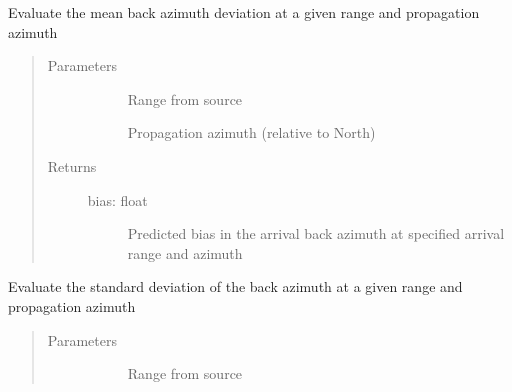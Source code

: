 \documentclass[letterpaper,10pt,english]{sphinxmanual}
\begin{document}
\begin{fulllineitems}
\begin{fulllineitems}
\label{\detokenize{stochprop.propagation:stochprop.propagation.PathGeometryModel.eval_az_dev_mn}}
Evaluate the mean back azimuth deviation at a given range
and propagation azimuth
\begin{quote}\begin{description}
\item[{Parameters}] \leavevmode\begin{description}
\item[{}] \leavevmode
Range from source

\item[{}] \leavevmode
Propagation azimuth (relative to North)

\end{description}

\item[{Returns}] \leavevmode\begin{description}
\item[{bias: float}] \leavevmode
Predicted bias in the arrival back azimuth at specified arrival range and azimuth

\end{description}

\end{description}\end{quote}

\end{fulllineitems}


\begin{fulllineitems}
\label{\detokenize{stochprop.propagation:stochprop.propagation.PathGeometryModel.eval_az_dev_std}}
Evaluate the standard deviation of the back azimuth at a given range
and propagation azimuth
\begin{quote}\begin{description}
\item[{Parameters}] \leavevmode\begin{description}
\item[{}] \leavevmode
Range from source


\end{description}
\end{description}
\end{quote}
\end{fulllineitems}
\end{fulllineitems}
\end{document}
